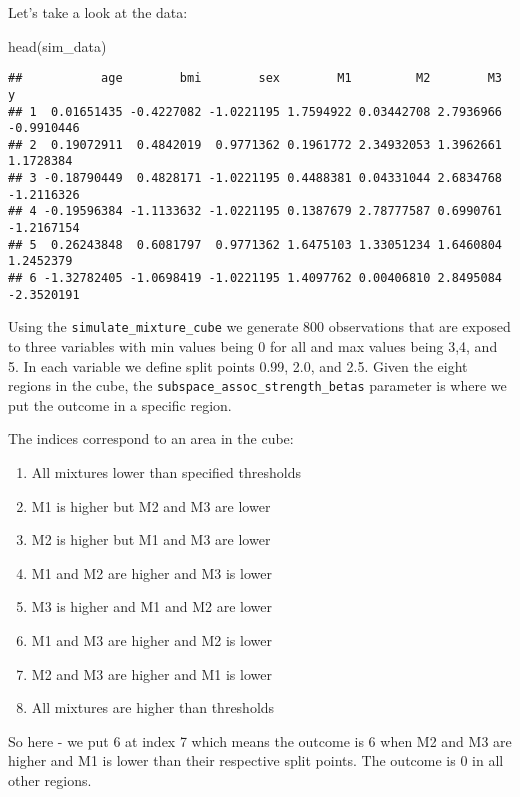 \documentclass[
]{article}
\newenvironment{Shaded}{\begin{snugshade}}{\end{snugshade}}
\newcommand{\FunctionTok}[1]{\textcolor[rgb]{0.00,0.00,0.00}{#1}}
\newcommand{\NormalTok}[1]{#1}
\providecommand{\tightlist}{%
  \setlength{\itemsep}{0pt}\setlength{\parskip}{0pt}}
\begin{document}
Let's take a look at the data:

\begin{Shaded}
\begin{Highlighting}[]
\FunctionTok{head}\NormalTok{(sim\_data)}
\end{Highlighting}
\end{Shaded}

\begin{verbatim}
##           age        bmi        sex        M1         M2        M3          y
## 1  0.01651435 -0.4227082 -1.0221195 1.7594922 0.03442708 2.7936966 -0.9910446
## 2  0.19072911  0.4842019  0.9771362 0.1961772 2.34932053 1.3962661  1.1728384
## 3 -0.18790449  0.4828171 -1.0221195 0.4488381 0.04331044 2.6834768 -1.2116326
## 4 -0.19596384 -1.1133632 -1.0221195 0.1387679 2.78777587 0.6990761 -1.2167154
## 5  0.26243848  0.6081797  0.9771362 1.6475103 1.33051234 1.6460804  1.2452379
## 6 -1.32782405 -1.0698419 -1.0221195 1.4097762 0.00406810 2.8495084 -2.3520191
\end{verbatim}

Using the \texttt{simulate\_mixture\_cube} we generate 800 observations
that are exposed to three variables with min values being 0 for all and
max values being 3,4, and 5. In each variable we define split points
0.99, 2.0, and 2.5. Given the eight regions in the cube, the
\texttt{subspace\_assoc\_strength\_betas} parameter is where we put the
outcome in a specific region.

The indices correspond to an area in the cube:

\begin{enumerate}
\def\labelenumi{\arabic{enumi}.}
\tightlist
\item
  All mixtures lower than specified thresholds
\item
  M1 is higher but M2 and M3 are lower
\item
  M2 is higher but M1 and M3 are lower
\item
  M1 and M2 are higher and M3 is lower
\item
  M3 is higher and M1 and M2 are lower
\item
  M1 and M3 are higher and M2 is lower
\item
  M2 and M3 are higher and M1 is lower
\item
  All mixtures are higher than thresholds
\end{enumerate}

So here - we put 6 at index 7 which means the outcome is 6 when M2 and
M3 are higher and M1 is lower than their respective split points. The
outcome is 0 in all other regions.
\end{document}
